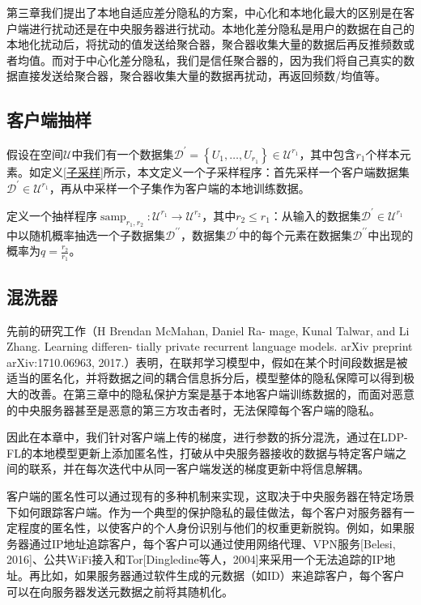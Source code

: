 第三章我们提出了本地自适应差分隐私的方案，中心化和本地化最大的区别是在客户端进行扰动还是在中央服务器进行扰动。本地化差分隐私是用户的数据在自己的本地化扰动后，将扰动的值发送给聚合器，聚合器收集大量的数据后再反推频数或者均值。而对于中心化差分隐私，我们是信任聚合器的，因为我们将自己真实的数据直接发送给聚合器，聚合器收集大量的数据再扰动，再返回频数/均值等。

\subsection{客户端抽样}
假设在空间$\mathcal{U}$中我们有一个数据集$\mathcal{D}^{\prime}=\left\{U_{1}, \ldots, U_{r_{1}}\right\} \in \mathcal{U}^{r_{1}}$，其中包含$r_{1}$个样本元素。如定义\ref{子采样}所示，本文定义一个子采样程序：首先采样一个客户端数据集$\mathcal{D}^{\prime} \in \mathcal{U}^{r_{1}}$，再从中采样一个子集作为客户端的本地训练数据。
\begin{define}[子采样]\label{子采样}
定义一个抽样程序$\operatorname{samp}_{r_{1}, r_{2}}: \mathcal{U}^{r_{1}} \rightarrow \mathcal{U}^{r_{2}}$，其中$r_{2} \leq r_{1}$：从输入的数据集$\mathcal{D}^{\prime} \in \mathcal{U}^{r_{1}}$ 中以随机概率抽选一个子数据集$\mathcal{D}^{\prime \prime}$，数据集$\mathcal{D}^{\prime}$中的每个元素在数据集$\mathcal{D}^{\prime \prime}$中出现的概率为$q=\frac{r_{2}}{r_{1}}$。
\end{define}



\subsection{混洗器}
先前的研究工作（H Brendan McMahan, Daniel Ra- mage, Kunal Talwar, and Li Zhang. Learning differen- tially private recurrent language models. arXiv preprint arXiv:1710.06963, 2017.）表明，在联邦学习模型中，假如在某个时间段数据是被适当的匿名化，并将数据之间的耦合信息拆分后，模型整体的隐私保障可以得到极大的改善。在第三章中的隐私保护方案是基于本地客户端训练数据的，而面对恶意的中央服务器甚至是恶意的第三方攻击者时，无法保障每个客户端的隐私。

因此在本章中，我们针对客户端上传的梯度，进行参数的拆分混洗，通过在LDP-FL的本地模型更新上添加匿名性，打破从中央服务器接收的数据与特定客户端之间的联系，并在每次迭代中从同一客户端发送的梯度更新中将信息解耦。

客户端的匿名性可以通过现有的多种机制来实现，这取决于中央服务器在特定场景下如何跟踪客户端。作为一个典型的保护隐私的最佳做法，每个客户对服务器有一定程度的匿名性，以使客户的个人身份识别与他们的权重更新脱钩。例如，如果服务器通过IP地址追踪客户，每个客户可以通过使用网络代理、VPN服务[Belesi, 2016]、公共WiFi接入和Tor[Dingledine等人，2004]来采用一个无法追踪的IP地址。再比如，如果服务器通过软件生成的元数据（如ID）来追踪客户，每个客户可以在向服务器发送元数据之前将其随机化。

